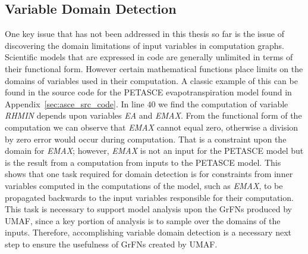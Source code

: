 \subsection{Variable Domain Detection\label{sec:var_domain_detection}}
One key issue that has not been addressed in this thesis so far is the issue of discovering the domain limitations of input variables in computation graphs.
Scientific models that are expressed in code are generally unlimited in terms of their functional form.
However certain mathematical functions place limits on the domains of variables used in their computation.
A classic example of this can be found in the source code for the PETASCE evapotranspiration model found in Appendix~\ref{sec:asce_src_code}.
In line $40$ we find the computation of variable \textit{RHMIN} depends upon variables \textit{EA} and \textit{EMAX}.
From the functional form of the computation we can observe that \textit{EMAX} cannot equal zero, otherwise a division by zero error would occur during computation.
That is a constraint upon the domain for \textit{EMAX}; however, \textit{EMAX} is not an input for the PETASCE model but is the result from a computation from inputs to the PETASCE model.
This shows that one task required for domain detection is for constraints from inner variables computed in the computations of the model, such as \textit{EMAX}, to be propagated backwards to the input variables responsible for their computation.
This task is necessary to support model analysis upon the GrFNs produced by UMAF, since a key portion of analysis is to sample over the domains of the inputs.
Therefore, accomplishing variable domain detection is a necessary next step to ensure the usefulness of GrFNs created by UMAF.

